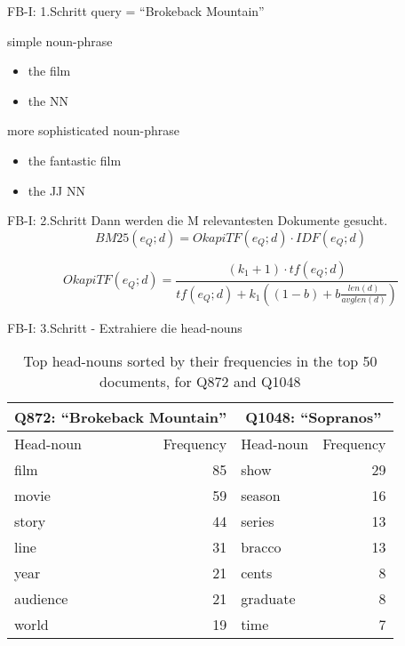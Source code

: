 \documentclass{beamer}
\begin{document}
\begin{frame}{FB-I: 1.Schritt}
	query = ``Brokeback Mountain''
	\begin{exampleblock}{simple noun-phrase}
		\begin{itemize}
			\item the film
			\item the NN
		\end{itemize}
	\end{exampleblock}
	\begin{exampleblock}{more sophisticated noun-phrase}
		\begin{itemize}
			\item the fantastic film
			\item the JJ NN
		\end{itemize}
	\end{exampleblock}
\end{frame}

\begin{frame}{FB-I: 2.Schritt}
	Dann werden die M relevantesten Dokumente gesucht.
	\[BM25(e_Q;d)=OkapiTF(e_Q;d)\cdot IDF(e_Q;d)\]

	\[OkapiTF(e_Q;d)=\frac{(k_1+1)\cdot tf(e_Q;d)}{tf(e_Q;d)+k_1\left( (1-b)+b\frac{len(d)}{avglen(d)} \right)}\]

\end{frame}

\begin{frame}{FB-I: 3.Schritt - Extrahiere die head-nouns}
	\begin{table}
		\centering
		\begin{tabular}{lrlr}
			\toprule
			\multicolumn{2}{c}{\textbf{Q872:} ``Brokeback Mountain''} & \multicolumn{2}{c}{\textbf{Q1048:} ``Sopranos''} \\
			\midrule
			Head-noun & Frequency & Head-noun & Frequency \\
			film	& 85	& show & 29 \\
			movie & 59 & season & 16 \\
			story & 44 & series & 13 \\
			line & 31 & bracco & 13 \\
			year & 21 & cents & 8 \\
			audience & 21 & graduate & 8 \\
			world & 19 & time & 7\\
			\bottomrule
		\end{tabular}
		\caption{Top head-nouns sorted by their frequencies in the top 50 documents, for Q872 and Q1048}
		\cite{paper:NaNg}
	\end{table}
\end{frame}
\end{document}
